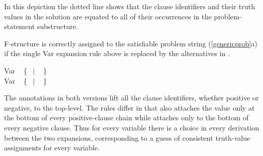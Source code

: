 \documentclass[output=paper,hidelinks]{langscibook}
\begin{document}
\noindent In this depiction the dotted line shows that the clause identifiers and their truth values in the solution are equated to all of their occurrences in the problem-statement substructure.

F-structure  is correctly assigned to the satisfiable problem string (\ref{genericprob}a) if the single Var expansion rule above is replaced by the alternatives in .

\ea\label{genericgen}
\ea\label{genP1} \small    Var \rarrow \  \hsp{-1em} 
                                                         \{\ \rcat{$+$}\hsp{-.75em} 
                                                              \hsp{-1em}
                                                              | \ 
                                                              \rcat{$-$}\hsp{-.75em}\hsp{-1em}
                                                          \}{\Large\kplus}\\[.3em]
                                     
 \ex\label{genP2}  \small  Var \rarrow \  \hsp{-1em} 
                                                      \{\ \rcat{$+$}\hsp{-.75em} 
                                                          \hsp{-1em}
                                                         | \ 
                                                          \rcat{$-$}\hsp{-.75em}\hsp{-1em}
                                                      \}\Large\kplus
\z\z

\noindent The  annotations in both versions lift all the clause identifiers, whether positive or negative, to the top-level. The rules differ in that  also attaches the value  only at the bottom of every positive-clause chain while  attaches  only to the bottom of every negative clause.  Thus for every variable there is a choice in every derivation between the two expansions, corresponding to a guess of consistent truth-value assignments for every variable.
\end{document}
